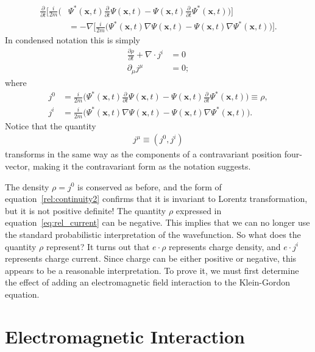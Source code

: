 \documentclass[titlepage,letterpaper,onecolumn,11pt,final]{report}
\newcommand{\psxt}{\Psi (\mathbf{x},t)}
\newcommand{\psxs}{\Psi^{*} (\mathbf{x},t)}
\numberwithin{equation}{section}
\numberwithin{figure}{section}
\begin{document}
\begin{equation}
	\begin{split}
	\frac{\partial}{\partial t} \bigg[ \frac{i}{2m} \bigg( &\psxs \frac{\partial}{\partial t} \psxt - \psxt \frac{\partial}{\partial t} \psxs \bigg) \bigg] \\
	&= - \nabla \bigg[ \frac{i}{2m} \bigg( \psxs \nabla \psxt - \psxt \nabla \psxs \bigg) \bigg].
	\end{split}
\end{equation}
%
In condensed notation this is simply
\begin{subequations}
\begin{align}
	\label{rel:continuity1}
	\frac{\partial \rho}{\partial t}  + \nabla \cdot j^{i} &= 0 \\
	\label{rel:continuity2}
	\partial_{\mu} j^{\mu} &= 0 ;
\end{align}
\end{subequations}
where
\begin{align}
	\label{eq:rel_current}
	j^{0} &= \frac{i}{2m} \bigg( \psxs \frac{\partial}{\partial t} \psxt - \psxt \frac{\partial}{\partial t} \psxs \bigg) \equiv \rho, \\
	\label{eq:rel_current_2}
	j^{i} &= \frac{i}{2m} \bigg( \psxs \nabla \psxt - \psxt \nabla \psxs \bigg).
\end{align}
%
Notice that the quantity
\begin{gather}
	j^{\mu} \equiv  \left( j^{0} , j^{i} \right)
\end{gather}
transforms in the same way as the components of a contravariant position four-vector, making it the contravariant form as the notation suggests.

The density $\rho = j^{0}$ is conserved as before, and the form of equation~\ref{rel:continuity2} confirms that it is invariant to Lorentz transformation, but it is not positive definite! The quantity $\rho$ expressed in equation~\ref{eq:rel_current} can be negative. This implies that we can no longer use the standard probabilistic interpretation of the wavefunction. So what does the quantity $\rho$ represent? It turns out that $e \cdot \rho$ represents charge density, and $e \cdot j^{i}$ represents charge current. Since charge can be either positive or negative, this appears to be a reasonable interpretation. To prove it, we must first determine the effect of adding an electromagnetic field interaction to the Klein-Gordon equation.

\section{Electromagnetic Interaction}
\end{document}
